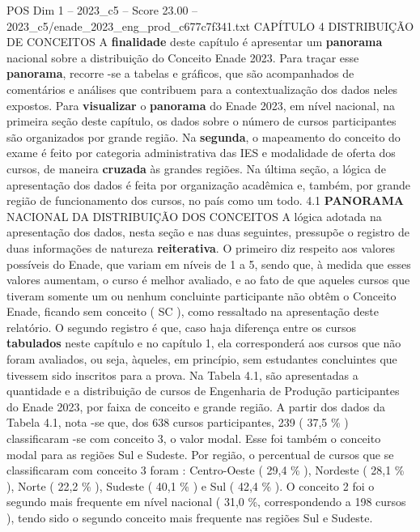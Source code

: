\begin{textsample}{POS Dim 1 – 2023\_c5 – Score 23.00 – 2023\_c5/enade\_2023\_eng\_prod\_c677c7f341.txt}  \label{ex:f1_pos_001}
CAPÍTULO 4 DISTRIBUIÇÃO DE CONCEITOS A \textbf{finalidade} deste capítulo é apresentar um \textbf{panorama} nacional sobre a distribuição do Conceito Enade 2023.
Para traçar esse \textbf{panorama}, recorre -se a tabelas e gráficos, que são acompanhados de comentários e análises que contribuem para a contextualização dos dados neles expostos.
Para \textbf{visualizar} o \textbf{panorama} do Enade 2023, em nível nacional, na primeira seção deste capítulo, os dados sobre o número de cursos participantes são organizados por grande região.
Na \textbf{segunda}, o mapeamento do conceito do exame é feito por categoria administrativa das IES e modalidade de oferta dos cursos, de maneira \textbf{cruzada} às grandes regiões.
Na última seção, a lógica de apresentação dos dados é feita por organização acadêmica e, também, por grande região de funcionamento dos cursos, no país como um todo. 4.1 \textbf{PANORAMA} NACIONAL DA DISTRIBUIÇÃO DOS CONCEITOS A lógica adotada na apresentação dos dados, nesta seção e nas duas seguintes, pressupõe o registro de duas informações de natureza \textbf{reiterativa}.
O primeiro diz respeito aos valores possíveis do Enade, que variam em níveis de 1 a 5, sendo que, à medida que esses valores aumentam, o curso é melhor avaliado, e ao fato de que aqueles cursos que tiveram somente um ou nenhum concluinte participante não obtêm o Conceito Enade, ficando sem conceito ( SC ), como ressaltado na apresentação deste relatório.
O segundo registro é que, caso haja diferença entre os cursos \textbf{tabulados} neste capítulo e no capítulo 1, ela corresponderá aos cursos que não foram avaliados, ou seja, àqueles, em princípio, sem estudantes concluintes que tivessem sido inscritos para a prova.
Na Tabela 4.1, são apresentadas a quantidade e a distribuição de cursos de Engenharia de Produção participantes do Enade 2023, por faixa de conceito e grande região.
A partir dos dados da Tabela 4.1, nota -se que, dos 638 cursos participantes, 239 ( 37,5 \% ) classificaram -se com conceito 3, o valor modal.
Esse foi também o conceito modal para as regiões Sul e Sudeste.
Por região, o percentual de cursos que se classificaram com conceito 3 foram : Centro-Oeste ( 29,4 \% ), Nordeste ( 28,1 \% ), Norte ( 22,2 \% ), Sudeste ( 40,1 \% ) e Sul ( 42,4 \% ).
O conceito 2 foi o segundo mais frequente em nível nacional ( 31,0 \%, correspondendo a 198 cursos ), tendo sido o segundo conceito mais frequente nas regiões Sul e Sudeste.

\end{textsample}
